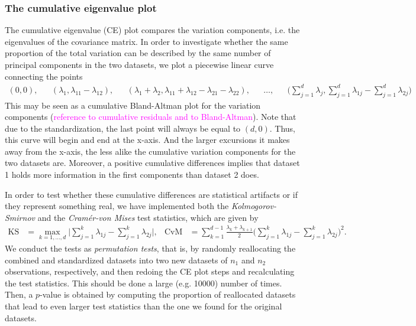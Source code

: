 \documentclass[titlepage,11pt,twoside]{article}
\newcommand{\hl}[1]{\textcolor{magenta}{#1}}
\begin{document}
\subsubsection{The cumulative eigenvalue plot}
 The cumulative eigenvalue (CE) plot compares the variation components, i.e. the eigenvalues of the covariance matrix.
In order to investigate whether the same proportion of the total variation can be described by the same number of principal components in the two datasets, we plot a piecewise linear curve connecting the points
\begin{align*}
(0,0), &&
(\lambda_1,\lambda_{11}-\lambda_{12}), &&
(\lambda_1 + \lambda_2,\lambda_{11}+\lambda_{12}-\lambda_{21}-\lambda_{22}), &&
\ldots, &&
\bigg( \sum_{j=1}^d \lambda_j, \sum_{j=1}^d \lambda_{1j} - \sum_{j=1}^d \lambda_{2j} \bigg)
\end{align*}
This may be seen as a cumulative Bland-Altman plot for the variation components (\hl{reference to cumulative residuals and to Bland-Altman}). Note that due to the standardization, the last point will always be equal to $(d,0)$. Thus, this curve will begin and end at the x-axis. And the larger excursions it makes away from the x-axis, the less alike the cumulative variation components for the two datasets are. Moreover, a positive cumulative differences implies that dataset 1 holds more information in the first components than dataset 2 does. 

In order to test whether these cumulative differences are statistical artifacts or if they represent something real, we have implemented both the \emph{Kolmogorov-Smirnov} and the \emph{Cram\'er-von Mises} test statistics, which are given by
\begin{align*}
\text{KS} &= \max_{k=1,\dotsc,d} \bigg\lvert \sum_{j=1}^k \lambda_{1j} - \sum_{j=1}^k \lambda_{2j} \bigg\rvert, &
\text{CvM} &= \sum_{k=1}^{d-1} \frac{\lambda_k + \lambda_{k+1}}{2} \bigg( \sum_{j=1}^k \lambda_{1j} - \sum_{j=1}^k \lambda_{2j} \bigg)^2.
\end{align*}
We conduct the tests as \textit{permutation tests}, that is, by randomly reallocating the combined and standardized datasets into two new datasets of $n_1$ and $n_2$ observations, respectively, and then redoing the CE plot steps and recalculating the test statistics. This should be done a large (e.g. 10000) number of times. Then, a $p$-value is obtained by computing the proportion of reallocated datasets that lead to even larger test statistics than the one we found for the original datasets. 
\end{document}
